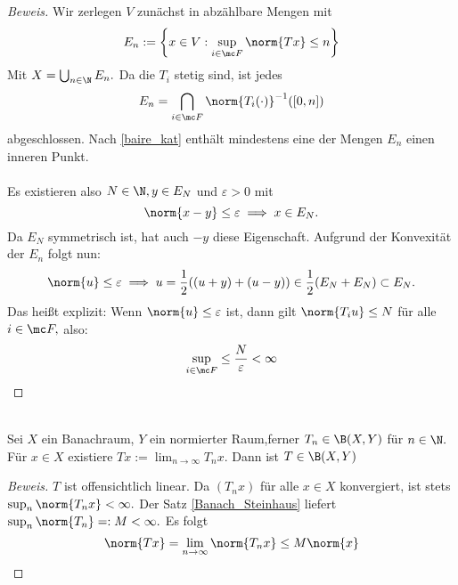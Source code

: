 \begin{theorem}
\begin{theorem}
	\begin{proof}[Beweis] 
		Wir zerlegen $V$ zunächst in abzählbare Mengen mit 
		\[
		E_n := \left\{ x \in V: \sup_{i \in \mc F}{\norm{Tx}} \leq n \right\} 
		\] Mit $X = \bigcup_{n \in \N}E_n.$ Da die $T_i$ stetig sind, ist jedes \[E_n = \bigcap_{i \in \mc F} \norm{T_i(\cdot)}^{-1}([0, n])\] abgeschlossen. Nach \ref{baire_kat} enthält mindestens eine der Mengen $E_n$ einen inneren Punkt. \\ \\ Es existieren also $N \in \N, y \in E_N$ und $\varepsilon > 0$ mit \[\norm{x-y} \leq \varepsilon \implies x \in E_N.\] Da $E_N$ symmetrisch ist, hat auch $-y$ diese Eigenschaft. Aufgrund der Konvexität der $E_n$ folgt nun: \[\norm{u} \leq \varepsilon \implies u = \frac{1}{2}((u+y)+(u-y)) \in \frac{1}{2}(E_N + E_N) \subset E_N.\] Das heißt explizit: Wenn $\norm{u} \leq \varepsilon$ ist, dann gilt $\norm{T_i u} \leq N$ für alle $i \in \mc F,$ also: \[\sup_{i \in \mc F} \leq \frac{N}{\varepsilon}< \infty\]
		
	\end{proof}
\end{theorem}

\begin{theorem} \\
	Sei $X$ ein Banachraum, $Y$ ein normierter Raum,ferner $T_n \in \B(X, Y)$ für $n \in \N.$ Für $x \in X$ existiere $Tx := \lim_{n \to \infty}T_nx.$ Dann ist $T \in \B(X, Y)$ 	
	\begin{proof}[Beweis] 
		$T$ ist offensichtlich linear. Da $(T_n x)$ für alle $x \in X$ konvergiert, ist stets $\sup_n \norm{T_nx}< \infty.$ Der Satz \ref{Banach_Steinhaus} liefert $\sup_n \norm{T_n} =: M < \infty.$ Es folgt \[\norm{Tx} = \lim_{n \to \infty}{\norm{T_nx} \leq M\norm{x}}\] 
	\end{proof}
\end{theorem}




\end{theorem}
